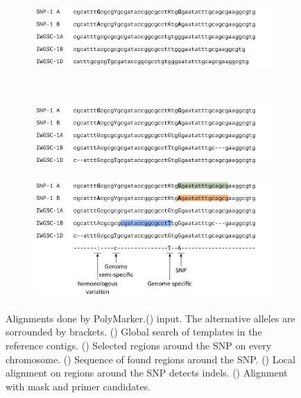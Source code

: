 \begin{figure}
    \begin{subfigure}[b]{0.4\textwidth}
        \caption{}
        \includegraphics[width=1\textwidth]{PolyMarker/Figures/aln/scaffoldsFound.pdf}
        \label{fig:poly:globalSequence}
    \end{subfigure}
    ~ %
    \begin{subfigure}[b]{0.4\textwidth}
        \caption{}
        \includegraphics[width=1\textwidth]{PolyMarker/Figures/aln/localAlignment.pdf}
        \label{fig:poly:localSequence}
    \end{subfigure}

    \begin{subfigure}[b]{0.8\textwidth}
        \caption{}
        \includegraphics[width=1\textwidth]{PolyMarker/Figures/aln/mask.pdf} 
        \label{fig:poly:mask}
    \end{subfigure}
    \caption{Alignments done by PolyMarker.() input. The alternative alleles are sorrounded by brackets. () Global search of templates in the reference contigs. () Selected regions around the SNP on every chromosome. () Sequence of found regions around the SNP. () Local alignment on regions around the SNP detects indels. () Alignment with mask and primer candidates.}
    \label{fig:global}
\end{figure}

